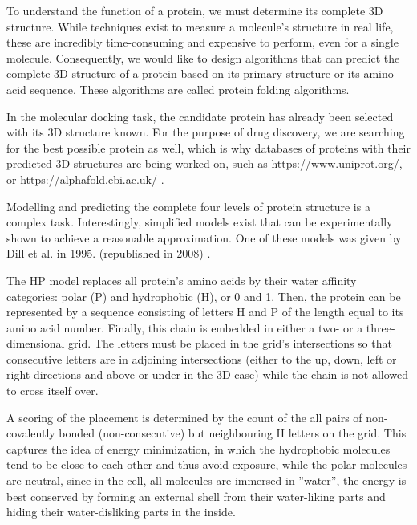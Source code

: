 To understand the function of a protein, we must determine its complete 3D structure. While techniques exist to measure a molecule's structure in real life, these are incredibly time-consuming and expensive to perform, even for a single molecule. Consequently, we would like to design algorithms that can predict the complete 3D structure of a protein based on its primary structure or its amino acid sequence. These algorithms are called protein folding algorithms.

In the molecular docking task, the candidate protein has already been selected with its 3D structure known. For the purpose of drug discovery, we are searching for the best possible protein as well, which is why databases of proteins with their predicted 3D structures are being worked on, such as \href{https://www.uniprot.org/}{https://www.uniprot.org/}, or \href{https://alphafold.ebi.ac.uk/}{https://alphafold.ebi.ac.uk/} \cite{senior_improved_2020}.

Modelling and predicting the complete four levels of protein structure is a complex task. Interestingly, simplified models exist that can be experimentally shown to achieve a reasonable approximation. One of these models was given by Dill et al. in 1995. (republished in 2008) \cite{dill_principles_2008}.

The HP model replaces all protein's amino acids by their water affinity categories: polar (P) and hydrophobic (H), or 0 and 1. Then, the protein can be represented by a sequence consisting of letters H and P of the length equal to its amino acid number. Finally, this chain is embedded in either a two- or a three-dimensional grid. The letters must be placed in the grid's intersections so that consecutive letters are in adjoining intersections (either to the up, down, left or right directions and above or under in the 3D case) while the chain is not allowed to cross itself over.

A scoring of the placement is determined by the count of the all pairs of non-covalently bonded (non-consecutive) but neighbouring H letters on the grid. This captures the idea of energy minimization, in which the hydrophobic molecules tend to be close to each other and thus avoid exposure, while the polar molecules are neutral, since in the cell, all molecules are immersed in ''water'', the energy is best conserved by forming an external shell from their water-liking parts and hiding their water-disliking parts in the inside.

